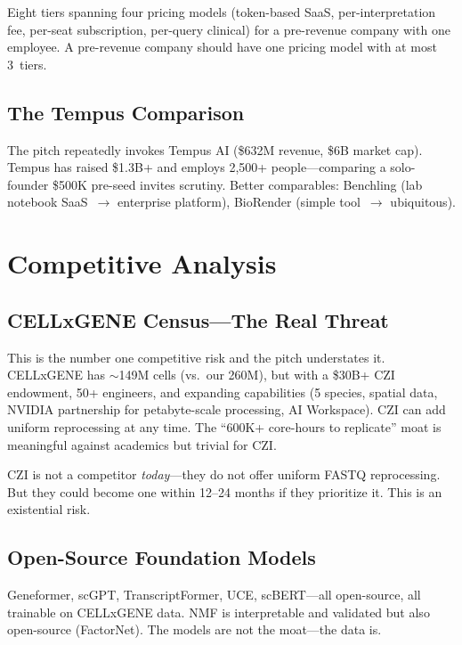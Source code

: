 \documentclass[10pt,twocolumn,letterpaper]{article}
\begin{document}
Eight tiers spanning four pricing models (token-based SaaS, per-interpretation
fee, per-seat subscription, per-query clinical) for a pre-revenue company with
one employee. A pre-revenue company should have one pricing model with at most
3~tiers.

\subsection{The Tempus Comparison}

The pitch repeatedly invokes Tempus AI (\$632M revenue, \$6B market cap).
Tempus has raised \$1.3B+ and employs 2,500+ people---comparing a solo-founder
\$500K pre-seed invites scrutiny. Better comparables: Benchling (lab notebook
SaaS~$\to$ enterprise platform), BioRender (simple tool~$\to$ ubiquitous).

\section{Competitive Analysis}
\label{sec:competitive}

\subsection{CELLxGENE Census---The Real Threat}

This is the number one competitive risk and the pitch understates it.
CELLxGENE has $\sim$149M cells (vs.\ our 260M), but with a \$30B+ CZI
endowment, 50+ engineers, and expanding capabilities (5 species, spatial data,
NVIDIA partnership for petabyte-scale processing, AI Workspace). CZI can add
uniform reprocessing at any time. The ``600K+ core-hours to replicate'' moat is
meaningful against academics but trivial for CZI.

CZI is not a competitor \emph{today}---they do not offer uniform FASTQ
reprocessing. But they could become one within 12--24 months if they prioritize
it. This is an existential risk.

\subsection{Open-Source Foundation Models}

Geneformer, scGPT, TranscriptFormer, UCE, scBERT---all open-source, all
trainable on CELLxGENE data. NMF is interpretable and validated but also
open-source (FactorNet). The models are not the moat---the data is.
\end{document}
